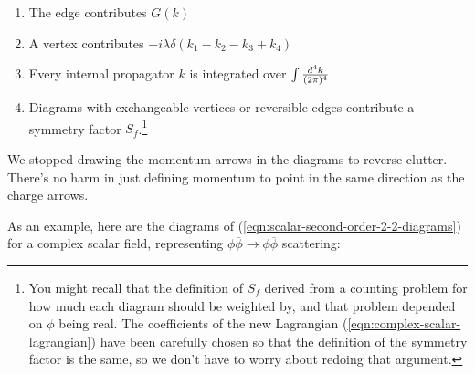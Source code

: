 \begin{enumerate}
  \item The edge  contributes $G(k)$
  \item A vertex  contributes $-i\lambda \delta(k_1 - k_2 - k_3 + k_4)$
  \item Every internal propagator $k$ is integrated over $\int \frac{d^{4} k}{(2\pi)^{4}}$
  \item Diagrams with exchangeable vertices or reversible edges contribute a symmetry factor $S_f$.\footnote{You might recall that the definition of $S_f$ derived from a counting problem for how much each diagram should be weighted by, and that problem depended on $\phi$ being real. The coefficients of the new Lagrangian (\ref{eqn:complex-scalar-lagrangian}) have been carefully chosen so that the definition of the symmetry factor is the same, so we don't have to worry about redoing that argument.}
\end{enumerate}
We stopped drawing the momentum arrows in the diagrams to reverse clutter. There's no harm in just defining momentum to point in the same direction as the charge arrows.

As an example, here are the diagrams of (\ref{eqn:scalar-second-order-2-2-diagrams}) for a complex scalar field, representing $\phi \overline\phi \rightarrow \phi \overline\phi$ scattering:

